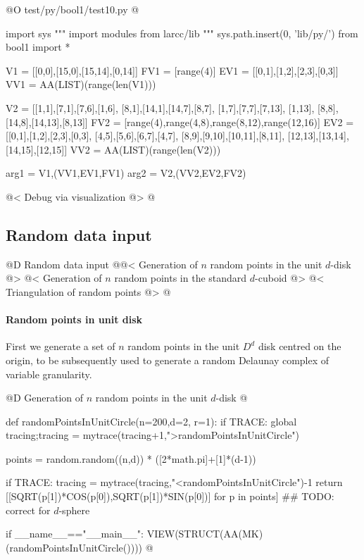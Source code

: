 \documentclass[11pt,oneside]{article}	%
\begin{document}
@O test/py/bool1/test10.py
@{
import sys
""" import modules from larcc/lib """
sys.path.insert(0, 'lib/py/')
from bool1 import *

V1 = [[0,0],[15,0],[15,14],[0,14]]
FV1 = [range(4)]
EV1 = [[0,1],[1,2],[2,3],[0,3]]
VV1 = AA(LIST)(range(len(V1)))

V2 = [[1,1],[7,1],[7,6],[1,6], [8,1],[14,1],[14,7],[8,7], [1,7],[7,7],[7,13],
		[1,13], [8,8],[14,8],[14,13],[8,13]]
FV2 = [range(4),range(4,8),range(8,12),range(12,16)]
EV2 = [[0,1],[1,2],[2,3],[0,3], [4,5],[5,6],[6,7],[4,7], [8,9],[9,10],[10,11],[8,11], [12,13],[13,14],[14,15],[12,15]]
VV2 = AA(LIST)(range(len(V2)))

arg1 = V1,(VV1,EV1,FV1)
arg2 = V2,(VV2,EV2,FV2)

@< Debug via visualization @>
@}




\subsection{Random data input} 

@D Random data input 
@{@< Generation of $n$ random points in the unit $d$-disk @>
@< Generation of $n$ random points in the standard $d$-cuboid @>
@< Triangulation of random points @>
@}

\paragraph{Random points in unit disk} 
First we generate a  set of $n$ random points in the unit $D^d$ disk centred on the origin, to be subsequently used to generate a random Delaunay complex of variable granularity.

@D Generation of $n$ random points in the unit $d$-disk 
@{def randomPointsInUnitCircle(n=200,d=2, r=1):
	if TRACE: global tracing;tracing = mytrace(tracing+1,">randomPointsInUnitCircle")

	points = random.random((n,d)) * ([2*math.pi]+[1]*(d-1))

	if TRACE: tracing = mytrace(tracing,"<randomPointsInUnitCircle")-1
	return [[SQRT(p[1])*COS(p[0]),SQRT(p[1])*SIN(p[0])] for p in points]
	## TODO: correct for $d$-sphere

if __name__=="__main__":
	VIEW(STRUCT(AA(MK)(randomPointsInUnitCircle()))) 
@}
\end{document}
